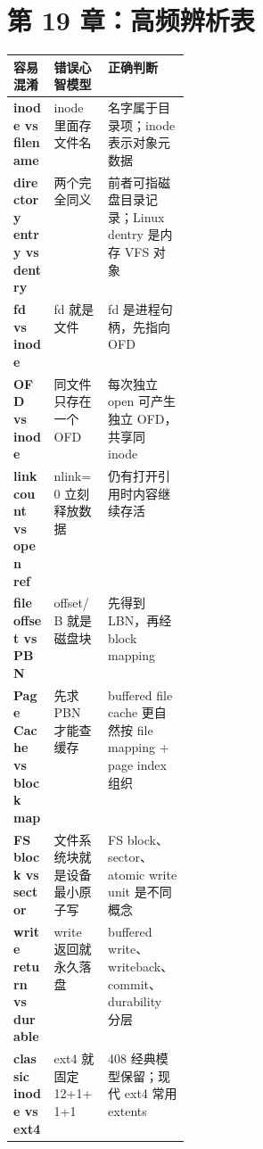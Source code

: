 \documentclass[11pt,a4paper]{ctexart}
\begin{document}
\section{第 19 章：高频辨析表}
\begin{center}
\small
\begin{tabularx}{\linewidth}{>{\bfseries}p{0.23\linewidth} X X}
\toprule
容易混淆 & 错误心智模型 & 正确判断 \\
\midrule
inode vs filename & inode 里面存文件名 & 名字属于目录项；inode 表示对象元数据 \\
directory entry vs dentry & 两个完全同义 & 前者可指磁盘目录记录；Linux dentry 是内存 VFS 对象 \\
fd vs inode & fd 就是文件 & fd 是进程句柄，先指向 OFD \\
OFD vs inode & 同文件只存在一个 OFD & 每次独立 open 可产生独立 OFD，共享同 inode \\
link count vs open ref & nlink=0 立刻释放数据 & 仍有打开引用时内容继续存活 \\
file offset vs PBN & offset/B 就是磁盘块 & 先得到 LBN，再经 block mapping \\
Page Cache vs block map & 先求 PBN 才能查缓存 & buffered file cache 更自然按 file mapping + page index 组织 \\
FS block vs sector & 文件系统块就是设备最小原子写 & FS block、sector、atomic write unit 是不同概念 \\
write return vs durable & write 返回就永久落盘 & buffered write、writeback、commit、durability 分层 \\
classic inode vs ext4 & ext4 就固定 12+1+1+1 & 408 经典模型保留；现代 ext4 常用 extents \\
\bottomrule
\end{tabularx}
\end{center}
\end{document}
